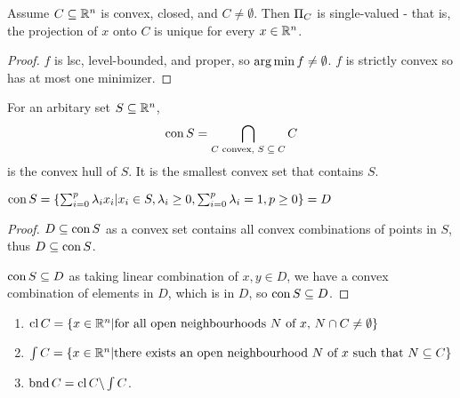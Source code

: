 \begin{thm}
  \label{sec:convexity-13}
  Assume $C \subseteq \mathbb{R}^{n}$ is convex, closed, and $C \neq
  \emptyset$.  Then $\operatorname*{\Pi}_{C}$ is single-valued - that is, the
  projection of $x$ onto $C$ is unique for every $x \in \mathbb{R}^{n}$.
\end{thm}

\begin{proof}
  $f$ is lsc, level-bounded, and proper, so $\operatorname*{arg\,min} f \neq
  \emptyset$.  $f$ is strictly convex so has at most one minimizer.
\end{proof}

\begin{defn}
  \label{sec:convexity-14}
  For an arbitary set $S \subseteq \mathbb{R}^{n}$,
  \begin{equation}
    \label{eq:10}
    \operatorname*{con} S = \bigcap_{\text{$C$ convex, $S \subseteq C$}} C
  \end{equation}
  is the convex hull of $S$.  It is the smallest convex set that
  contains $S$.
\end{defn}

\begin{thm}
  \label{sec:convexity-15}
  $\operatorname*{con} S = \{ \sum_{i=0}^{p} \lambda_{i} x_{i} | x_{i} \in S,
  \lambda_{i} \geq 0, \sum_{i=0}^{p} \lambda_{i} = 1, p \geq 0  \} = D$
\end{thm}

\begin{proof}
  $D \subseteq \operatorname*{con} S$ as a convex set contains all convex
  combinations of points in $S$, thus $D \subseteq \operatorname*{con} S$.

  $\operatorname*{con} S \subseteq D$ as taking linear combination of $x, y \in D$,
  we have a convex combination of elements in $D$, which is in $D$, so
  $\operatorname*{con} S \subseteq D$.

\end{proof}

\begin{thm}
  \label{sec:convexity-16}
  \begin{enumerate}
  \item $\operatorname*{cl} C = \{ x \in \mathbb{R}^{n} | \text{for all open neighbourhoods
      $N$ of $x$, $N \cap C \neq \emptyset$} \}$
  \item $\int C = \{ x \in \mathbb{R}^{n} | \text{there exists an open
      neighbourhood $N$ of $x$ such that $N \subseteq C$} \} $
  \item $\operatorname*{bnd} C = \operatorname*{cl} C \backslash \int C$.
  \end{enumerate}
\end{thm}

